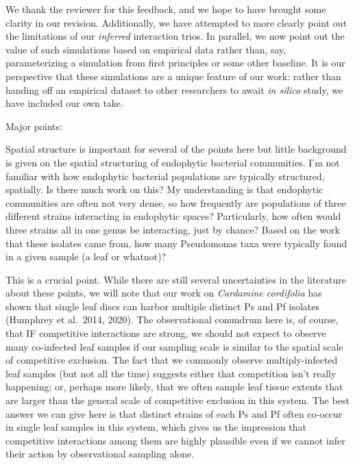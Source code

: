 \documentclass[11pt,]{article}
\begin{document}
We thank the reviewer for this feedback, and we hope to have brought
some clarity in our revision. Additionally, we have attempted to more
clearly point out the limitations of our \emph{inferred} interaction
trios. In parallel, we now point out the value of such simulations based
on empirical data rather than, say, parameterizing a simulation from
first principles or some other baseline. It is our perspective that
these simulations are a unique feature of our work: rather than handing
off an empirical dataset to other researchers to await \emph{in silico}
study, we have included our own take.

\begin{blockquote}
Major points:

Spatial structure is important for several of the points here but little
background is given on the spatial structuring of endophytic bacterial
communities. I'm not familiar with how endophytic bacterial populations
are typically structured, spatially. Is there much work on this? My
understanding is that endophytic communities are often not very dense,
so how frequently are populations of three different strains interacting
in endophytic spaces? Particularly, how often would three strains all in
one genus be interacting, just by chance? Based on the work that these
isolates came from, how many Pseudomonas taxa were typically found in a
given sample (a leaf or whatnot)?
\end{blockquote}

This is a crucial point. While there are still several uncertainties in
the literature about these points, we will note that our work on
\emph{Cardamine cordifolia} has shown that single leaf discs can harbor
multiple distinct Ps and Pf isolates (Humphrey et al.~2014, 2020). The
observational conundrum here is, of course, that IF competitive
interactions are strong, we should not expect to observe many
co-infected leaf samples if our sampling scale is similar to the spatial
scale of competitive exclusion. The fact that we commonly observe
multiply-infected leaf samples (but not all the time) suggests either
that competition isn't really happening; or, perhaps more likely, that
we often sample leaf tissue extents that are larger than the general
scale of competitive exclusion in this system. The best answer we can
give here is that distinct strains of each Ps and Pf often co-occur in
single leaf samples in this system, which gives us the impression that
competitive interactions among them are highly plausible even if we
cannot infer their action by observational sampling alone.
\end{document}
